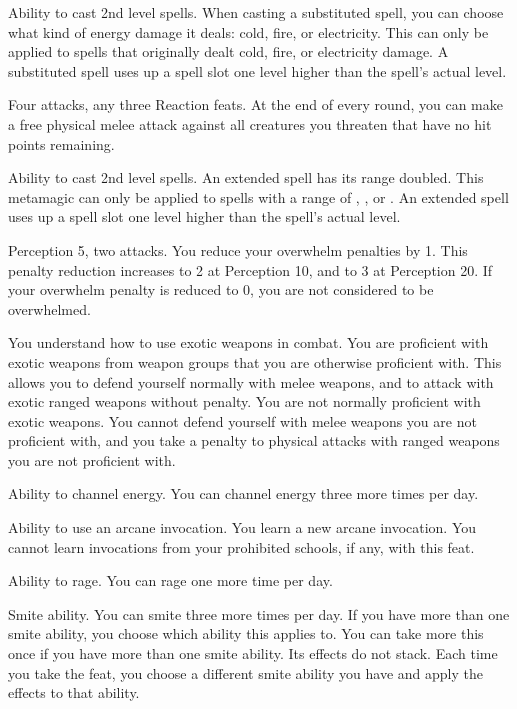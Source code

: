 \featpre Ability to cast 2nd level spells.
\featben When casting a substituted spell, you can choose what kind of energy damage it deals: cold, fire, or electricity.
This can only be applied to spells that originally dealt cold, fire, or electricity damage.
A substituted spell uses up a spell slot one level higher than the spell's actual level.

\featpres Four attacks, any three Reaction feats.
\featben At the end of every round, you can make a free physical melee attack against all creatures you threaten that have no hit points remaining.

\featpre Ability to cast 2nd level spells.
\featben An extended spell has its range doubled.
This metamagic can only be applied to spells with a range of \rngclose, \rngmed, or \rnglong.
An extended spell uses up a spell slot one level higher than the spell's actual level.

\featpre Perception 5, two attacks.
\featben You reduce your overwhelm penalties by 1.
This penalty reduction increases to 2 at Perception 10, and to 3 at Perception 20.
If your overwhelm penalty is reduced to 0, you are not considered to be overwhelmed.

You understand how to use exotic weapons in combat.
\featben You are proficient with exotic weapons from weapon groups that you are otherwise proficient with.
This allows you to defend yourself normally with melee weapons, and to attack with exotic ranged weapons without penalty.
You are not normally proficient with exotic weapons.
You cannot defend yourself with melee weapons you are not proficient with, and you take a  penalty to physical attacks with ranged weapons you are not proficient with.

\featpre Ability to channel energy.
\featben You can channel energy three more times per day.

\featpre Ability to use an arcane invocation.
\featben You learn a new arcane invocation.
You cannot learn invocations from your prohibited schools, if any, with this feat.

\featpre Ability to rage.
\featben You can rage one more time per day.

\featpre Smite ability.
\featben You can smite three more times per day.
If you have more than one smite ability, you choose which ability this applies to.
You can take more this once if you have more than one smite ability.
Its effects do not stack.
Each time you take the feat, you choose a different smite ability you have and apply the effects to that ability.

